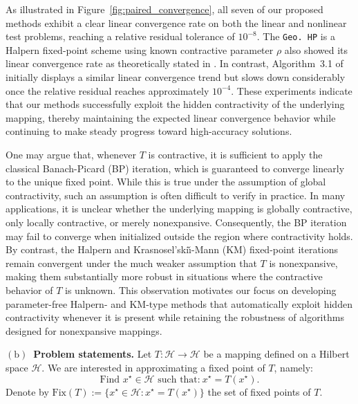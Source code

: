 \documentclass{article}
\theoremstyle{plain}
\theoremstyle{definition}
\newcommand{\Hil}{\mathcal{H}}
\newcommand{\sets}[1]{\{#1\}}
\newcommand{\0}{\boldsymbol{0}}
\begin{document}
As illustrated in Figure~\ref{fig:paired_convergence}, all seven of our proposed methods exhibit a clear linear convergence rate on both the linear and nonlinear test problems, reaching a relative residual tolerance of $10^{-8}$. 
The \texttt{Geo.~HP} is a Halpern fixed-point scheme using known contractive parameter $\rho$ also showed its linear convergence rate as theoretically stated in \cite{park2022exact}.
In contrast, Algorithm~3.1 of \cite{he2024convergence} initially displays a similar linear convergence trend but slows down considerably once the relative residual reaches approximately $10^{-4}$. 
These experiments indicate that our methods successfully exploit the hidden contractivity of the underlying mapping, thereby maintaining the expected linear convergence behavior while continuing to make steady progress toward high-accuracy solutions.

One may argue that, whenever $T$ is contractive, it is sufficient to apply the classical Banach-Picard (BP) iteration, which is guaranteed to converge linearly to the unique fixed point. 
While this is true under the assumption of global contractivity, such an assumption is often difficult to verify in practice. 
In many applications, it is unclear whether the underlying mapping is globally contractive, only locally contractive, or merely nonexpansive. 
Consequently, the BP iteration may fail to converge when initialized outside the region where contractivity holds. 
By contrast, the Halpern and Krasnosel'ski\v{\i}-Mann (KM) fixed-point iterations remain convergent under the much weaker assumption that $T$ is nonexpansive, making them substantially more robust in situations where the contractive behavior of $T$ is unknown. 
This observation motivates our focus on developing parameter-free Halpern- and KM-type methods that automatically exploit hidden contractivity whenever it is present while retaining the robustness of algorithms designed for nonexpansive mappings.

\vspace{0.75ex}
\noindent\textbf{$\mathrm{(b)}$~Problem statements.}
Let $T : \Hil \to \Hil$ be a mapping defined on a Hilbert space $\Hil$.
We are interested in approximating a fixed point of $T$, namely:
\begin{equation}\label{eq:FP}
\textrm{Find $x^{\star}\in \Hil$ such that:}~ x^{\star} = T(x^{\star}).
\tag{FP}
\end{equation}
Denote by $\mathrm{Fix}(T) := \sets{x^{\star} \in \Hil : x^{\star} = T(x^{\star}) }$ the set of fixed points of $T$.
\end{document}
